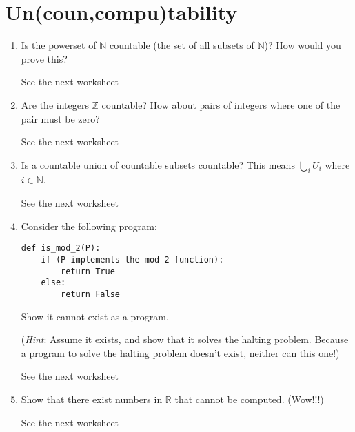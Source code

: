 \documentclass{article}
\begin{document}
    \section{Un(coun,compu)tability}
    \begin{enumerate}
        \item Is the powerset of $\mathbb{N}$ countable (the set of all subsets of $\mathbb{N}$)? How would you prove this?
        \begin{solution}
            See the next worksheet
        \end{solution}
        \item Are the integers $\mathbb{Z}$ countable? How about pairs of integers where one of the pair must be zero?
        \begin{solution}
            See the next worksheet
        \end{solution}
        \item Is a countable union of countable subsets countable? This means $\bigcup_{i} U_i$ where $i \in \mathbb{N}$.
        \begin{solution}
            See the next worksheet
        \end{solution}
        \item Consider the following program: 
\begin{verbatim}        
def is_mod_2(P):
    if (P implements the mod 2 function):
        return True 
    else:
        return False
\end{verbatim}
Show it cannot exist as a program.

(\textit{Hint}: Assume it exists, and show that it solves the halting problem. Because a program to solve the halting problem doesn't exist, neither can this one!)
\begin{solution}
    See the next worksheet
\end{solution}
    \item Show that there exist numbers in $\mathbb{R}$ that cannot be computed. (Wow!!!)
    \begin{solution}
        See the next worksheet
    \end{solution}
    \end{enumerate}
    
\end{document}
